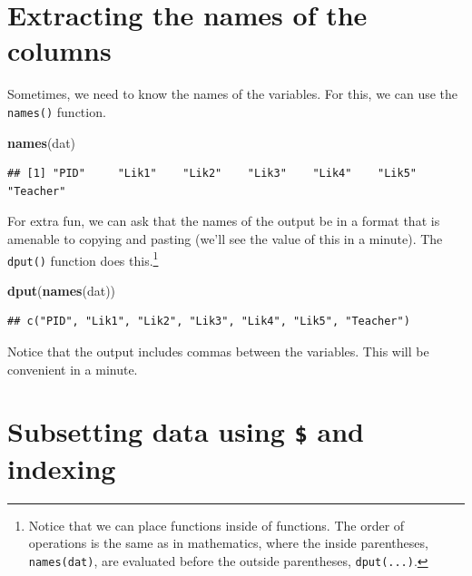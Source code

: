 \documentclass[
]{book}
\newenvironment{Shaded}{\begin{snugshade}}{\end{snugshade}}
\newcommand{\KeywordTok}[1]{\textcolor[rgb]{0.13,0.29,0.53}{\textbf{#1}}}
\newcommand{\NormalTok}[1]{#1}
\begin{document}
\hypertarget{extracting-the-names-of-the-columns}{%
\section{Extracting the names of the columns}\label{extracting-the-names-of-the-columns}}

Sometimes, we need to know the names of the variables. For this, we can use the \texttt{names()} function.

\begin{Shaded}
\begin{Highlighting}[]
\KeywordTok{names}\NormalTok{(dat)}
\end{Highlighting}
\end{Shaded}

\begin{verbatim}
## [1] "PID"     "Lik1"    "Lik2"    "Lik3"    "Lik4"    "Lik5"    "Teacher"
\end{verbatim}

For extra fun, we can ask that the names of the output be in a format that is amenable to copying and pasting (we'll see the value of this in a minute). The \texttt{dput()} function does this.\footnote{Notice that we can place functions inside of functions. The order of operations is the same as in mathematics, where the inside parentheses, \texttt{names(dat)}, are evaluated before the outside parentheses, \texttt{dput(...)}.}

\begin{Shaded}
\begin{Highlighting}[]
\KeywordTok{dput}\NormalTok{(}\KeywordTok{names}\NormalTok{(dat))}
\end{Highlighting}
\end{Shaded}

\begin{verbatim}
## c("PID", "Lik1", "Lik2", "Lik3", "Lik4", "Lik5", "Teacher")
\end{verbatim}

Notice that the output includes commas between the variables. This will be convenient in a minute.

\hypertarget{subsetting-data-using-and-indexing}{%
\section{\texorpdfstring{Subsetting data using \texttt{\$} and indexing}{Subsetting data using \$ and indexing}}\label{subsetting-data-using-and-indexing}}
\end{document}
